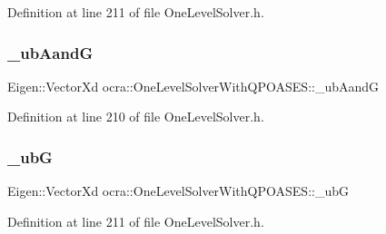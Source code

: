 Definition at line 211 of file One\+Level\+Solver.\+h.

\hypertarget{classocra_1_1OneLevelSolverWithQPOASES_afa4902490254547640625dc2d9512577}{}\label{classocra_1_1OneLevelSolverWithQPOASES_afa4902490254547640625dc2d9512577} 
\subsubsection{\texorpdfstring{\+\_\+ub\+AandG}{\_ubAandG}}
{\footnotesize\ttfamily Eigen\+::\+Vector\+Xd ocra\+::\+One\+Level\+Solver\+With\+Q\+P\+O\+A\+S\+E\+S\+::\+\_\+ub\+AandG\hspace{0.3cm}{\ttfamily [protected]}}



Definition at line 210 of file One\+Level\+Solver.\+h.

\hypertarget{classocra_1_1OneLevelSolverWithQPOASES_ac3b8f982ead7c50e7396d99e63f02ac3}{}\label{classocra_1_1OneLevelSolverWithQPOASES_ac3b8f982ead7c50e7396d99e63f02ac3} 
\subsubsection{\texorpdfstring{\+\_\+ubG}{\_ubG}}
{\footnotesize\ttfamily Eigen\+::\+Vector\+Xd ocra\+::\+One\+Level\+Solver\+With\+Q\+P\+O\+A\+S\+E\+S\+::\+\_\+ubG\hspace{0.3cm}{\ttfamily [protected]}}



Definition at line 211 of file One\+Level\+Solver.\+h.

\hypertarget{classocra_1_1OneLevelSolverWithQPOASES_a67a41fa1b101ce2885012b796c8bfe47}{}\label{classocra_1_1OneLevelSolverWithQPOASES_a67a41fa1b101ce2885012b796c8bfe47} 
